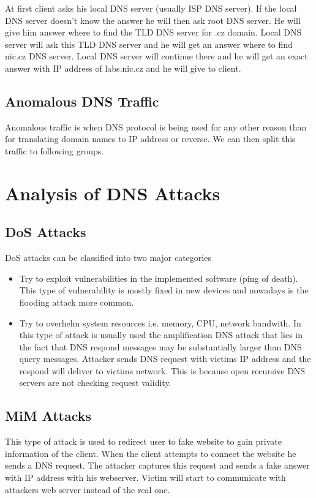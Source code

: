 \documentclass[thesis=M,english]{FITthesis}[2012/10/20]
\begin{document}
At first client asks his local DNS server (usually ISP DNS server). If the local DNS server doesn't know the answer he will then ask root DNS server. He will give him answer where to find the TLD DNS server for .cz domain. Local DNS server will ask this TLD DNS server and he will get an answer where to find nic.cz DNS server. Local DNS server will continue there and he will get an exact answer with IP address of labs.nic.cz and he will give to client.
\section{Anomalous DNS Traffic}
Anomalous traffic is when DNS protocol is being used for any other reason than for translating domain names to IP address or reverse. We can then split this traffic to following groups.
\chapter{Analysis of DNS Attacks}

\section{DoS Attacks}
DoS attacks can be classified into two major categories \cite{KamMosGen08}
\begin{itemize}
\item Try to exploit vulnerabilities in the implemented software (ping of death). This type of vulnerability is mostly fixed in new devices and nowadays is the flooding attack more common.
\item Try to overhelm system resources i.e. memory, CPU, network bandwith. In this type of attack is usually used the amplification DNS attack that lies in the fact that DNS respond messages may be substantially larger than DNS query messages. Attacker sends DNS request with victims IP address and the respond will deliver to victims network. This is because open recursive DNS servers are not checking request validity.
\end{itemize}
\section{MiM Attacks}
This type of attack is used to redirect user to fake website to gain private information of the client. When the client attempts to connect the website he sends a DNS request. The attacker captures this request and sends a fake answer with IP address with his webserver. Victim will start to communicate with attackers web server instead of the real one. \cite{BaiHuSon11}
\end{document}
